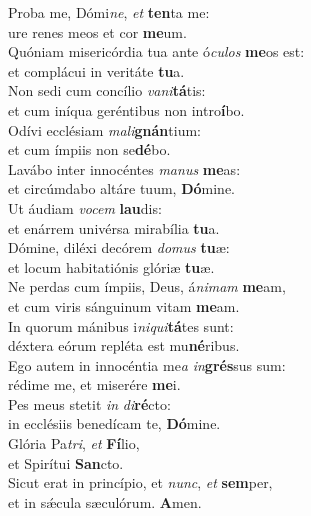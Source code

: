 \evenverse Proba me, Dómi\textit{ne}, \textit{et} \textbf{ten}ta me:~\*\\
\evenverse ure renes meos et cor \textbf{me}um.\\
\oddverse Quóniam misericórdia tua ante ó\textit{cu}\textit{los} \textbf{me}os est:~\*\\
\oddverse et complácui in veritáte \textbf{tu}a.\\
\evenverse Non sedi cum concílio \textit{va}\textit{ni}\textbf{tá}tis:~\*\\
\evenverse et cum iníqua geréntibus non intro\textbf{í}bo.\\
\oddverse Odívi ecclésiam \textit{ma}\textit{li}\textbf{gnán}tium:~\*\\
\oddverse et cum ímpiis non se\textbf{dé}bo.\\
\evenverse Lavábo inter innocéntes \textit{ma}\textit{nus} \textbf{me}as:~\*\\
\evenverse et circúmdabo altáre tuum, \textbf{Dó}mine.\\
\oddverse Ut áudiam \textit{vo}\textit{cem} \textbf{lau}dis:~\*\\
\oddverse et enárrem univérsa mirabília \textbf{tu}a.\\
\evenverse Dómine, diléxi decórem \textit{do}\textit{mus} \textbf{tu}æ:~\*\\
\evenverse et locum habitatiónis glóriæ \textbf{tu}æ.\\
\oddverse Ne perdas cum ímpiis, Deus, á\textit{ni}\textit{mam} \textbf{me}am,~\*\\
\oddverse et cum viris sánguinum vitam \textbf{me}am.\\
\evenverse In quorum mánibus i\textit{ni}\textit{qui}\textbf{tá}tes sunt:~\*\\
\evenverse déxtera eórum repléta est mu\textbf{né}ribus.\\
\oddverse Ego autem in innocéntia me\textit{a} \textit{in}\textbf{grés}sus sum:~\*\\
\oddverse rédime me, et miserére \textbf{me}i.\\
\evenverse Pes meus stetit \textit{in} \textit{di}\textbf{ré}cto:~\*\\
\evenverse in ecclésiis benedícam te, \textbf{Dó}mine.\\
\oddverse Glória Pa\textit{tri}, \textit{et} \textbf{Fí}lio,~\*\\
\oddverse et Spirítui \textbf{San}cto.\\
\evenverse Sicut erat in princípio, et \textit{nunc}, \textit{et} \textbf{sem}per,~\*\\
\evenverse et in sǽcula sæculórum. \textbf{A}men.\\
